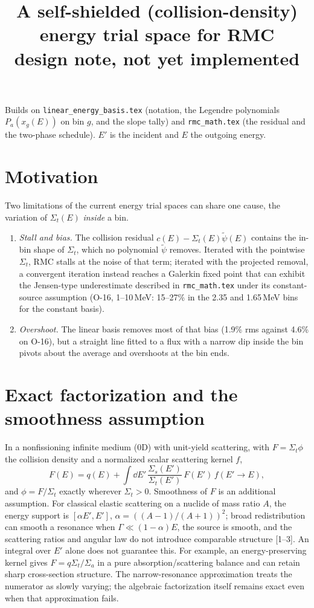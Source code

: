 \documentclass[11pt]{article}
\title{A self-shielded (collision-density) energy trial space for RMC\\
\large design note, not yet implemented}
\date{}
\newcommand{\tpsi}{\tilde\psi}
\newcommand{\Sigt}{\Sigma_t}
\begin{document}
\maketitle

\noindent Builds on \texttt{linear\_energy\_basis.tex} (notation, the Legendre
polynomials $P_a(x_g(E))$ on bin $g$, and the slope tally) and \texttt{rmc\_math.tex}
(the residual and the two-phase schedule). $E'$ is the incident and $E$ the outgoing
energy.

\section{Motivation}

Two limitations of the current energy trial spaces can share one cause, the variation of
$\Sigt(E)$ \emph{inside} a bin.
\begin{enumerate}
  \item \emph{Stall and bias.} The collision residual $c(E) - \Sigt(E)\tpsi(E)$
  contains the in-bin shape of $\Sigt$, which no polynomial $\tpsi$ removes. Iterated
  with the pointwise $\Sigt$, RMC stalls at the noise of that term; iterated with the
  projected removal, a convergent iteration instead reaches a Galerkin fixed point
  that can exhibit the Jensen-type underestimate described in \texttt{rmc\_math.tex}
  under its constant-source assumption (O-16, 1--10\,MeV: 15--27\%
  in the 2.35 and 1.65\,MeV bins for the constant basis).
  \item \emph{Overshoot.} The linear basis removes most of that bias (1.9\% rms against
  4.6\% on O-16), but a straight line fitted to a flux with a narrow dip inside the bin
  pivots about the average and overshoots at the bin ends.
\end{enumerate}

\section{Exact factorization and the smoothness assumption}

In a nonfissioning infinite medium (0D) with unit-yield scattering, with
$F=\Sigt\phi$ the collision density and a normalized scalar scattering kernel $f$,
\begin{equation}
  F(E) = q(E) + \int \dd E'\, \frac{\Sigma_s(E')}{\Sigt(E')}\,F(E')\,f(E'\to E),
  \label{eq:collision}
\end{equation}
and $\phi = F/\Sigt$ exactly wherever $\Sigt>0$. Smoothness of $F$ is an additional
assumption. For classical elastic scattering on a nuclide of mass ratio $A$, the
energy support is $[\alpha E',E']$, $\alpha=((A-1)/(A+1))^2$; broad redistribution
can smooth a resonance when $\Gamma\ll(1-\alpha)E$, the source is smooth, and the
scattering ratios and angular law do not introduce comparable structure [1--3].
An integral over $E'$ alone does not guarantee this. For example, an
energy-preserving kernel gives $F=q\Sigt/\Sigma_a$ in a pure absorption/scattering
balance and can retain sharp cross-section structure.
The narrow-resonance approximation treats the numerator as slowly varying;
the algebraic factorization itself remains exact even when that approximation fails.
\end{document}
